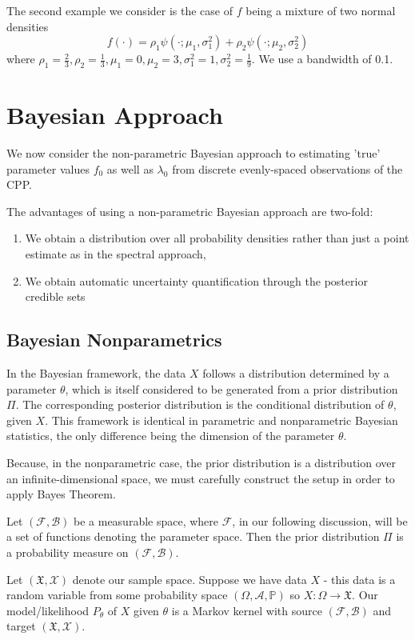 \documentclass[a4paper,11pt]{article}
\theoremstyle{theorem}
\theoremstyle{definition}
\begin{document}
The second example we consider is the case of $f$ being a mixture of two normal densities
\[
f(\cdot) = \rho_{1}\psi(\cdot;\mu_{1},\sigma_{1}^{2}) + \rho_{2}\psi(\cdot;\mu_{2}, \sigma_{2}^{2}) 
\] 
where $\rho_{1} = \frac{2}{3}, \rho_{2} = \frac{1}{3}, \mu_{1} = 0, \mu_{2} = 3, \sigma_{1}^{2} = 1, \sigma_{2}^{2} = \frac{1}{9}$. We use a bandwidth of 0.1.

\section{Bayesian Approach}

We now consider the non-parametric Bayesian approach to estimating 'true' parameter values $f_{0}$ as well as $\lambda_{0}$ from discrete evenly-spaced observations of the CPP.

The advantages of using a non-parametric Bayesian approach are two-fold:
\begin{enumerate}
\item We obtain a distribution over all probability densities rather than just a point estimate as in the spectral approach,
\item We obtain automatic uncertainty quantification through the posterior credible sets
\end{enumerate}

\subsection{Bayesian Nonparametrics}

In the Bayesian framework, the data $X$ follows a distribution determined by a parameter $\theta$, which is itself considered to be generated from a prior distribution $\Pi$. The corresponding posterior distribution is the conditional distribution of $\theta$, given $X$. This framework is identical in parametric and nonparametric Bayesian statistics, the only difference being the dimension of the parameter $\theta$.

Because, in the nonparametric case, the prior distribution is a distribution over an infinite-dimensional space, we must carefully construct the setup in order to apply Bayes Theorem.

Let $(\mathcal{F}, \mathcal{B})$ be a measurable space, where $\mathcal{F}$, in our following discussion, will be a set of functions denoting the parameter space. Then the prior distribution $\Pi$ is a probability measure on $(\mathcal{F}, \mathcal{B})$.

Let $(\mathfrak{X}, \mathcal{X})$ denote our sample space. Suppose we have data $X$ - this data is a random variable from some probability space $(\Omega, \mathcal{A}, \mathbb{P})$ so $X: \Omega \to \mathfrak{X}$. Our model/likelihood $P_{\theta}$ of $X$ given $\theta$ is a Markov kernel with source $(\mathcal{F}, \mathcal{B})$ and target $(\mathfrak{X}, \mathcal{X})$. 
\end{document}
